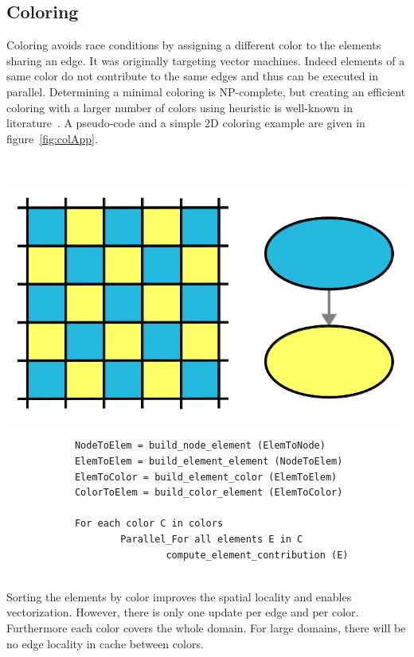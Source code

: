 \documentclass[10pt]{IOS-Book-Article}
\begin{document}
\subsection{Coloring}
\label{sec:col}
Coloring avoids race conditions by assigning a different color to the elements sharing an edge.
It was originally targeting vector machines. Indeed elements of a same color do not contribute to the same edges and thus can be executed in parallel.
Determining a minimal coloring is NP-complete, but creating an efficient coloring with a larger number of colors using heuristic is well-known in literature~\cite{CPUfe}.
A pseudo-code and a simple 2D coloring example are given in figure~\ref{fig:colApp}.
~\\~\\~\\
{
\begin{minipage}[tp]{0.34\textwidth}
	\includegraphics[scale=0.15]{Coloring_approach.png}
\end{minipage}
\begin{minipage}[tp]{0.55\textwidth}
 		\small
 		\begin{verbatim}
			NodeToElem = build_node_element (ElemToNode)
			ElemToElem = build_element_element (NodeToElem)
			ElemToColor = build_element_color (ElemToElem)
			ColorToElem = build_color_element (ElemToColor)

			For each color C in colors
    				Parallel_For all elements E in C
        					compute_element_contribution (E)
 		\end{verbatim}
 \end{minipage}	
 }
 ~\\
Sorting the elements by color improves the spatial locality and enables vectorization.
However, there is only one update per edge and per color. Furthermore each color covers the whole domain.
For large domains, there will be no edge locality in cache between colors.
\end{document}
